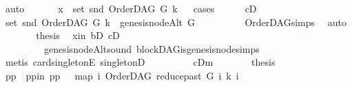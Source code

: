 \begin{isabellebody}
\ auto\ \isanewline
\ \ \isamarkupfalse%
\ \isamarkupfalse%
\ {\isachardoublequoteopen}x\ {\isasymin}\ set\ {\isacharparenleft}{\kern0pt}snd\ {\isacharparenleft}{\kern0pt}OrderDAG\ G\ k{\isacharparenright}{\kern0pt}{\isacharparenright}{\kern0pt}{\isachardoublequoteclose}\isanewline
\ \ \isamarkupfalse%
{\isacharparenleft}{\kern0pt}cases{\isacharparenright}{\kern0pt}\isanewline
\ \ \ \ \isamarkupfalse%
\ {\isacharparenleft}{\kern0pt}cD{}{\isacharparenright}{\kern0pt}\isanewline
\ \ \ \ \isamarkupfalse%
\ \isamarkupfalse%
\ {\isachardoublequoteopen}set\ {\isacharparenleft}{\kern0pt}snd\ {\isacharparenleft}{\kern0pt}OrderDAG\ G\ k{\isacharparenright}{\kern0pt}{\isacharparenright}{\kern0pt}\ {\isacharequal}{\kern0pt}\ {\isacharbraceleft}{\kern0pt}genesis{\isacharunderscore}{\kern0pt}nodeAlt\ G{\isacharbraceright}{\kern0pt}{\isachardoublequoteclose}\ \isanewline
\ \ \ \ \ \ \isamarkupfalse%
\ {}\ OrderDAG{\isachardot}{\kern0pt}simps\ \isamarkupfalse%
\ auto\isanewline
\ \ \ \ \isamarkupfalse%
\ \isamarkupfalse%
\ {\isacharquery}{\kern0pt}thesis\ \isamarkupfalse%
\ x{\isacharunderscore}{\kern0pt}in\ bD\ cD{}\isanewline
\ \ \ \ \ \ \ \ \ genesis{\isacharunderscore}{\kern0pt}nodeAlt{\isacharunderscore}{\kern0pt}sound\ blockDAG{\isachardot}{\kern0pt}is{\isacharunderscore}{\kern0pt}genesis{\isacharunderscore}{\kern0pt}node{\isachardot}{\kern0pt}simps\isanewline
\ \ \ \ \ \ \isamarkupfalse%
\ {}\isanewline
\ \ \ \ \ \ \isamarkupfalse%
\ {\isacharparenleft}{\kern0pt}metis\ card{\isacharunderscore}{\kern0pt}{}{\isacharunderscore}{\kern0pt}singletonE\ singletonD{\isacharparenright}{\kern0pt}\ \isanewline
\ \ \isamarkupfalse%
\isanewline
\ \ \ \ \isamarkupfalse%
\ {\isacharparenleft}{\kern0pt}cDm{\isacharparenright}{\kern0pt}\isanewline
\ \ \ \ \isamarkupfalse%
\ \isamarkupfalse%
\ {\isacharquery}{\kern0pt}thesis\isanewline
\ \ \ \ \isamarkupfalse%
\ {\isacharminus}{\kern0pt}\isanewline
\ \ \ \ \ \ \isamarkupfalse%
\ pp\ \ pp{\isacharunderscore}{\kern0pt}in{\isacharcolon}{\kern0pt}\ {\isachardoublequoteopen}pp\ {\isacharequal}{\kern0pt}\ \ {\isacharparenleft}{\kern0pt}map\ {\isacharparenleft}{\kern0pt}{\isasymlambda}i{\isachardot}{\kern0pt}\ {\isacharparenleft}{\kern0pt}OrderDAG\ {\isacharparenleft}{\kern0pt}reduce{\isacharunderscore}{\kern0pt}past\ G\ i{\isacharparenright}{\kern0pt}\ k{\isacharcomma}{\kern0pt}\ i{\isacharparenright}{\kern0pt}{\isacharparenright}{\kern0pt}\isanewline

\end{isabellebody}
